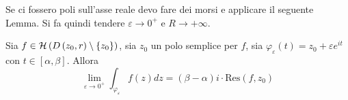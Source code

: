 Se ci fossero poli sull'asse reale devo fare dei morsi e applicare il seguente Lemma. Si fa quindi tendere $\varepsilon \rightarrow 0^{+}$ e $R\rightarrow +\infty $.
\begin{thm}
 Sia $f\in \Hc \left( D\left( z_{0} ,r\right) \setminus \left\{z_{0}\right\}\right)$, sia $z_{0}$ un polo semplice per $f$, sia $\varphi _{\varepsilon }\left( t\right) =z_{0} +\varepsilon e^{it}$ con $t\in \left[ \alpha ,\beta \right]$. Allora
\begin{equation*}
\lim _{\varepsilon \rightarrow 0^{+}}\int _{\varphi _{\varepsilon }} f\left( z\right) dz=\left( \beta -\alpha \right) i\cdotp \mathrm{Res}\left( f,z_{0}\right)
\end{equation*}
\end{thm}
\begin{figure}[htpb]
	\centering
{} %

\begin{tikzpicture}[x=0.75pt,y=0.75pt,yscale=-1,xscale=1]


\end{tikzpicture}
\end{figure}
